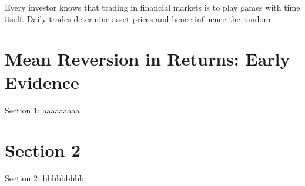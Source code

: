 \minitoc

\vspace{0.5cm}
Every investor knows that trading in financial markets is to play
games with time itself. Daily trades determine asset prices and hence
influence the random 

\section{Mean Reversion in Returns: Early Evidence}
Section 1: aaaaaaaaa

\section{Section 2}
Section 2: bbbbbbbbb